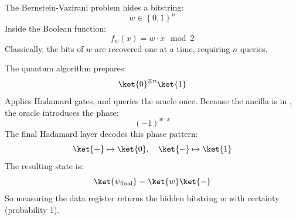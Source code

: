 \highspace
\begin{takeawaysbox}
    The Bernstein-Vazirani problem hides a bitstring:
    \begin{equation*}
        w \in \left\{0,1\right\}^n
    \end{equation*}
    Inside the Boolean function:
    \begin{equation*}
        f_w(x) = w \cdot x \mod 2
    \end{equation*}
    Classically, the bits of $w$ are recovered one at a time, requiring $n$ queries.

    \highspace
    The quantum algorithm prepares:
    \begin{equation*}
        \ket{0}^{\otimes n} \ket{1}
    \end{equation*}
    Applies Hadamard gates, and queries the oracle once. Because the ancilla is in \ket{-}, the oracle introduces the phase:
    \begin{equation*}
        \left(-1\right)^{w \cdot x}
    \end{equation*}
    The final Hadamard layer decodes this phase pattern:
    \begin{equation*}
        \ket{+} \mapsto \ket{0}, \quad \ket{-} \mapsto \ket{1}
    \end{equation*}
    The resulting state is:
    \begin{equation*}
        \ket{\psi_{\text{final}}} = \ket{w} \ket{-}
    \end{equation*}
    So measuring the data register returns the hidden bitstring $w$ with certainty (probability 1).
\end{takeawaysbox}